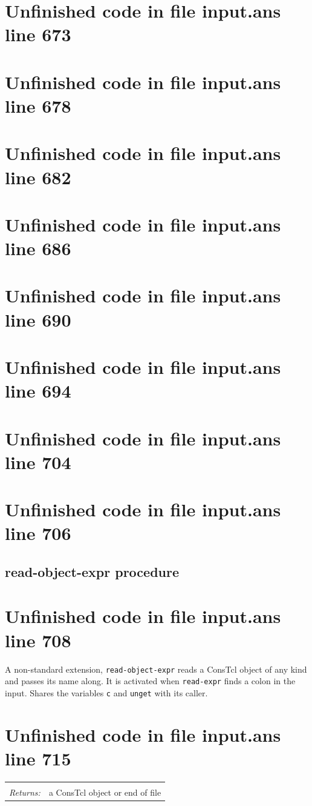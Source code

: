 \documentclass[twoside,9pt]{report}
\begin{document}
\section{Unfinished code in file input.ans line 673}
\section{Unfinished code in file input.ans line 678}
\section{Unfinished code in file input.ans line 682}
\section{Unfinished code in file input.ans line 686}
\section{Unfinished code in file input.ans line 690}
\section{Unfinished code in file input.ans line 694}
\section{Unfinished code in file input.ans line 704}
\section{Unfinished code in file input.ans line 706}
\subsection{read-object-expr procedure}
\label{read-object-expr-procedure}
\section{Unfinished code in file input.ans line 708}


A non-standard extension, \texttt{read-object-expr} reads a ConsTcl object of any kind and passes its name along. It is activated when \texttt{read-expr} finds a colon in the input. Shares the variables \texttt{c} and \texttt{unget} with its caller.

\section{Unfinished code in file input.ans line 715}
\noindent\begin{tabular}{ |p{1.9cm} p{8cm}| }
\hline
\rowcolor[HTML]{CCCCCC} \multicolumn{2}{|l|}{\bf read-object-expr (internal)} \\
\textit{Returns:} & a ConsTcl object or end of file \\
\hline
\end{tabular}
\end{document}
